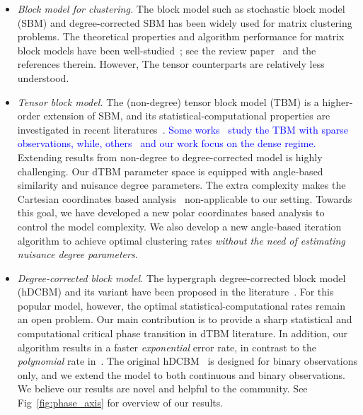 \documentclass[lettersize,onecolumn,journal]{IEEEtran}
\theoremstyle{definition}
\theoremstyle{definition}
\begin{document}
\begin{itemize}[wide]
    \item \textit{Block model for clustering.} The block model such as stochastic block model (SBM) and degree-corrected SBM has been widely used for matrix clustering problems. The theoretical properties and algorithm performance for matrix block models have been well-studied~\citep{gao2018community}; see the review paper~\citep{abbe2017community} and the references therein. However, The tensor counterparts are relatively less understood. 
    
    \item  \textit{Tensor block model.} The (non-degree) tensor block model (TBM) is a higher-order extension of SBM, and its statistical-computational properties are investigated in recent literatures~\citep{wang2019multiway, han2020exact, ghoshdastidar2017consistency}. \textcolor{blue}{Some works~\citep{ahn2018hypergraph} study the TBM with sparse observations, while, others~\citep{wang2019multiway, han2020exact} and our work focus on the dense regime.} Extending results from non-degree to degree-corrected model is highly challenging. Our dTBM parameter space is equipped with angle-based similarity and nuisance degree parameters. The extra complexity makes the Cartesian coordinates based analysis~\citep{han2020exact} non-applicable to our setting. Towards this goal, we have developed a new polar coordinates based analysis to control the model complexity. We also develop a new angle-based iteration algorithm to achieve optimal clustering rates \emph{without the need of estimating nuisance degree parameters}.
    
    
    \item \textit{Degree-corrected block model.} The hypergraph degree-corrected block model (hDCBM) and its variant have been proposed in the literature~\citep{ke2019community, yuan2018testing}. For this popular model, however, the optimal statistical-computational rates remain an open problem. Our main contribution is to provide a sharp statistical and computational critical phase transition in dTBM literature. In addition, our algorithm results in a faster \emph{exponential} error rate, in contrast to the \emph{polynomial} rate in~\cite{ke2019community}. The original hDCBM~\citep{ke2019community} is designed for binary observations only, and we extend the model to both continuous and binary observations. We believe our results are novel and helpful to the community. See Fig~\ref{fig:phase_axis} for overview of our results. 
    

\end{itemize}
\end{document}
